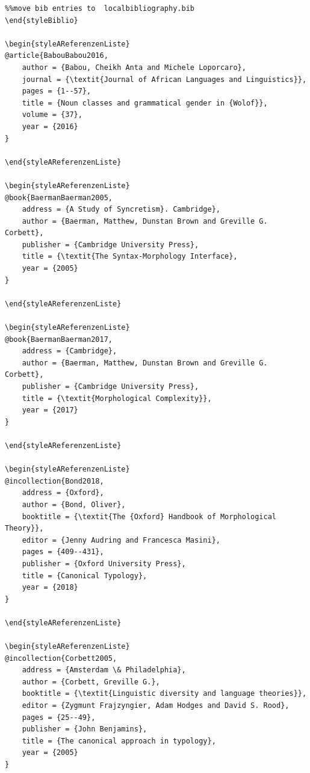 \documentclass[output=paper]{langscibook}
\begin{document}
\begin{styleBiblio}
\begin{verbatim}%%move bib entries to  localbibliography.bib
\end{styleBiblio}

\begin{styleAReferenzenListe}
@article{BabouBabou2016,
	author = {Babou, Cheikh Anta and Michele Loporcaro},
	journal = {\textit{Journal of African Languages and Linguistics}},
	pages = {1--57},
	title = {Noun classes and grammatical gender in {Wolof}},
	volume = {37},
	year = {2016}
}

\end{styleAReferenzenListe}

\begin{styleAReferenzenListe}
@book{BaermanBaerman2005,
	address = {A Study of Syncretism}. Cambridge},
	author = {Baerman, Matthew, Dunstan Brown and Greville G. Corbett},
	publisher = {Cambridge University Press},
	title = {\textit{The Syntax-Morphology Interface},
	year = {2005}
}

\end{styleAReferenzenListe}

\begin{styleAReferenzenListe}
@book{BaermanBaerman2017,
	address = {Cambridge},
	author = {Baerman, Matthew, Dunstan Brown and Greville G. Corbett},
	publisher = {Cambridge University Press},
	title = {\textit{Morphological Complexity}},
	year = {2017}
}

\end{styleAReferenzenListe}

\begin{styleAReferenzenListe}
@incollection{Bond2018,
	address = {Oxford},
	author = {Bond, Oliver},
	booktitle = {\textit{The {Oxford} Handbook of Morphological Theory}},
	editor = {Jenny Audring and Francesca Masini},
	pages = {409--431},
	publisher = {Oxford University Press},
	title = {Canonical Typology},
	year = {2018}
}

\end{styleAReferenzenListe}

\begin{styleAReferenzenListe}
@incollection{Corbett2005,
	address = {Amsterdam \& Philadelphia},
	author = {Corbett, Greville G.},
	booktitle = {\textit{Linguistic diversity and language theories}},
	editor = {Zygmunt Frajzyngier, Adam Hodges and David S. Rood},
	pages = {25--49},
	publisher = {John Benjamins},
	title = {The canonical approach in typology},
	year = {2005}
}


\end{verbatim}
\end{styleBiblio}
\end{document}
